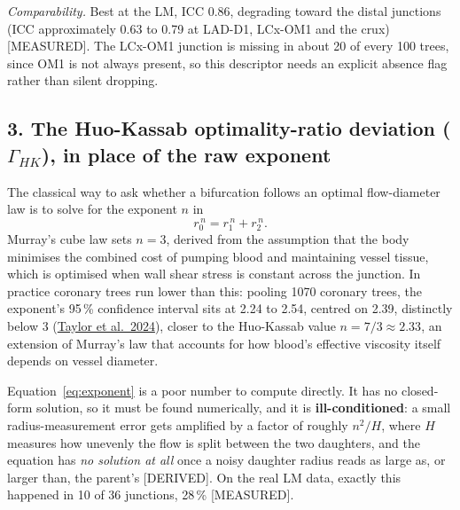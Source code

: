 \documentclass[11pt]{article}
\begin{document}
\emph{Comparability.} Best at the LM, ICC 0.86, degrading toward the distal junctions (ICC
approximately 0.63 to 0.79 at LAD-D1, LCx-OM1 and the crux) [MEASURED]. The LCx-OM1 junction is
missing in about 20 of every 100 trees, since OM1 is not always present, so this descriptor needs an
explicit absence flag rather than silent dropping.

\subsection*{3. The Huo-Kassab optimality-ratio deviation ($\Gamma_{HK}$), in place of the raw exponent}

The classical way to ask whether a bifurcation follows an optimal flow-diameter law is to solve for
the exponent $n$ in
\begin{equation}
  r_0^{\,n} = r_1^{\,n} + r_2^{\,n} .
  \label{eq:exponent}
\end{equation}
Murray's cube law sets $n=3$, derived from the assumption that the body minimises the combined cost
of pumping blood and maintaining vessel tissue, which is optimised when wall shear stress is
constant across the junction. In practice coronary trees run lower than this: pooling 1070 coronary
trees, the exponent's 95\,\% confidence interval sits at 2.24 to 2.54, centred on 2.39, distinctly
below 3 (\href{https://doi.org/10.1152/ajpheart.00142.2024}{Taylor et al.\ 2024}), closer to the Huo-Kassab value $n=7/3\approx2.33$, an extension of
Murray's law that accounts for how blood's effective viscosity itself depends on vessel diameter.

Equation~\ref{eq:exponent} is a poor number to compute directly. It has no closed-form solution, so
it must be found numerically, and it is \textbf{ill-conditioned}: a small radius-measurement error
gets amplified by a factor of roughly $n^2/H$, where $H$ measures how unevenly the flow is split
between the two daughters, and the equation has \emph{no solution at all} once a noisy daughter
radius reads as large as, or larger than, the parent's [DERIVED]. On the real LM data, exactly this
happened in 10 of 36 junctions, 28\,\% [MEASURED].
\end{document}
